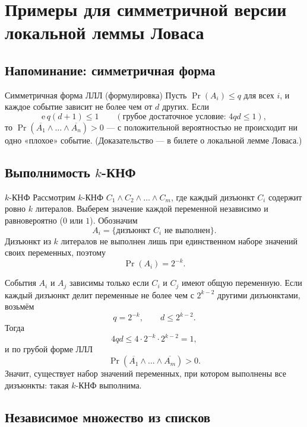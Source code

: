
\section{Примеры для симметричной версии локальной леммы Ловаса}

\subsection{Напоминание: симметричная форма}

\begin{Theorem}{Симметричная форма ЛЛЛ (формулировка)}{}
	Пусть $\Pr(A_i)\le q$ для всех $i$, и каждое событие зависит не более чем от $d$ других. Если
	\[
	\mathrm e\,q(d+1)\le 1
	\qquad(\text{грубое достаточное условие: } 4qd\le 1),
	\]
	то $\Pr\!\left(\overline{A_1}\wedge\dots\wedge\overline{A_n}\right)>0$ — с положительной вероятностью не происходит ни одно «плохое» событие. (Доказательство — в билете о локальной лемме Ловаса.)
\end{Theorem}

\subsection{Выполнимость $k$-КНФ}

\begin{Example}{$k$-КНФ}{}
	Рассмотрим $k$-КНФ $C_1\wedge C_2\wedge\dots\wedge C_m$, где каждый дизъюнкт $C_i$ содержит ровно $k$ литералов. Выберем значение каждой переменной независимо и равновероятно ($0$ или $1$). Обозначим
	\[
	A_i=\{\text{дизъюнкт $C_i$ не выполнен}\}.
	\]
	Дизъюнкт из $k$ литералов не выполнен лишь при единственном наборе значений своих переменных, поэтому
	\[
	\Pr(A_i)=2^{-k}.
	\]

	События $A_i$ и $A_j$ зависимы только если $C_i$ и $C_j$ имеют общую переменную. Если каждый дизъюнкт делит переменные не более чем с $2^{k-2}$ другими дизъюнктами, возьмём
	\[
	q=2^{-k},\qquad d\le 2^{k-2}.
	\]
	Тогда
	\[
	4qd\le 4\cdot 2^{-k}\cdot 2^{k-2}=1,
	\]
	и по грубой форме ЛЛЛ
	\[
	\Pr\!\left(\overline{A_1}\wedge\dots\wedge\overline{A_m}\right)>0.
	\]
	Значит, существует набор значений переменных, при котором выполнены все дизъюнкты: такая $k$-КНФ выполнима.
\end{Example}


\subsection{Независимое множество из списков}

